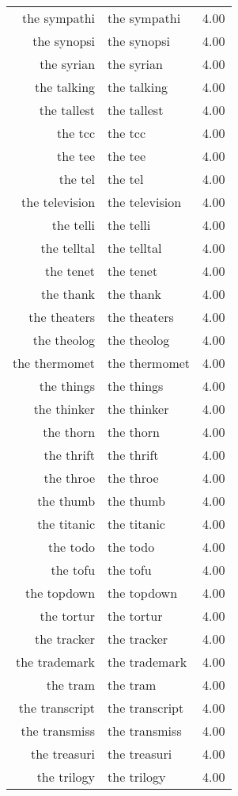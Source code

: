 \begin{table}[ht]
\begin{tabular}{rlr}
  the sympathi & the sympathi & 4.00 \\ 
  the synopsi & the synopsi & 4.00 \\ 
  the syrian & the syrian & 4.00 \\ 
  the talking & the talking & 4.00 \\ 
  the tallest & the tallest & 4.00 \\ 
  the tcc & the tcc & 4.00 \\ 
  the tee & the tee & 4.00 \\ 
  the tel & the tel & 4.00 \\ 
  the television & the television & 4.00 \\ 
  the telli & the telli & 4.00 \\ 
  the telltal & the telltal & 4.00 \\ 
  the tenet & the tenet & 4.00 \\ 
  the thank & the thank & 4.00 \\ 
  the theaters & the theaters & 4.00 \\ 
  the theolog & the theolog & 4.00 \\ 
  the thermomet & the thermomet & 4.00 \\ 
  the things & the things & 4.00 \\ 
  the thinker & the thinker & 4.00 \\ 
  the thorn & the thorn & 4.00 \\ 
  the thrift & the thrift & 4.00 \\ 
  the throe & the throe & 4.00 \\ 
  the thumb & the thumb & 4.00 \\ 
  the titanic & the titanic & 4.00 \\ 
  the todo & the todo & 4.00 \\ 
  the tofu & the tofu & 4.00 \\ 
  the topdown & the topdown & 4.00 \\ 
  the tortur & the tortur & 4.00 \\ 
  the tracker & the tracker & 4.00 \\ 
  the trademark & the trademark & 4.00 \\ 
  the tram & the tram & 4.00 \\ 
  the transcript & the transcript & 4.00 \\ 
  the transmiss & the transmiss & 4.00 \\ 
  the treasuri & the treasuri & 4.00 \\ 
  the trilogy & the trilogy & 4.00 \\ 

\end{tabular}
\end{table}
